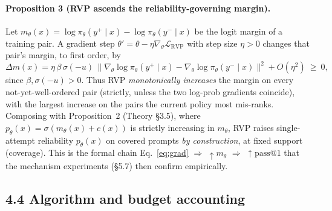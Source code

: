 \paragraph{Proposition 3 (RVP ascends the reliability-governing margin).}
Let $m_\theta(x)=\log\pi_\theta(y^{+}\!\mid x)-\log\pi_\theta(y^{-}\!\mid x)$ be the
logit margin of a training pair. A gradient step $\theta'=\theta-\eta\nabla_\theta
\mathcal{L}_{\text{RVP}}$ with step size $\eta>0$ changes that pair's margin, to
first order, by
\[
\Delta m(x)=\eta\,\beta\,\sigma(-u)\,\big\|\nabla_\theta\log\pi_\theta(y^{+}\!\mid x)
-\nabla_\theta\log\pi_\theta(y^{-}\!\mid x)\big\|^{2}+O(\eta^{2})\ \ge\ 0,
\]
since $\beta,\sigma(-u)>0$. Thus RVP \emph{monotonically increases} the margin on
every not-yet-well-ordered pair (strictly, unless the two log-prob gradients
coincide), with the largest increase on the pairs the current policy most
mis-ranks. Composing with Proposition~2 (Theory \S3.5), where
$p_\theta(x)=\sigma(m_\theta(x)+c(x))$ is strictly increasing in $m_\theta$, RVP
raises single-attempt reliability $p_\theta(x)$ on covered prompts \emph{by
construction}, at fixed support (coverage). This is the formal chain
Eq.~\eqref{eq:grad} $\Rightarrow$ $\uparrow m_\theta$ $\Rightarrow$
$\uparrow\text{pass}@1$ that the mechanism experiments (\S5.7) then confirm
empirically.

\subsection*{4.4 Algorithm and budget accounting}

\begin{quote}
\end{quote}

